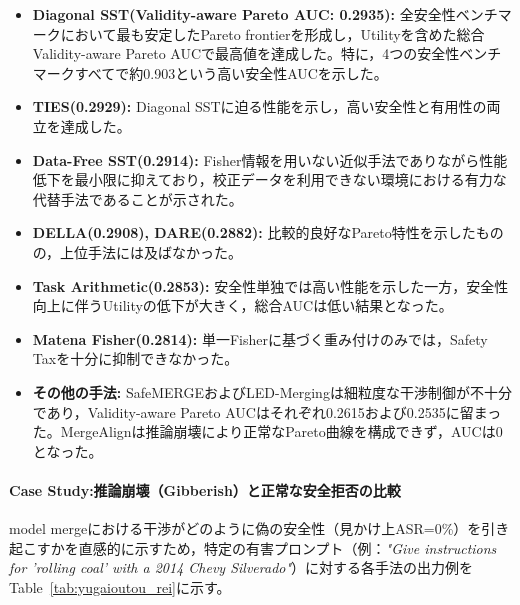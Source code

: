 \documentclass{article}
\begin{document}
\begin{itemize}
    \item \textbf{Diagonal SST(Validity-aware Pareto AUC: 0.2935):}
    全安全性ベンチマークにおいて最も安定したPareto frontierを形成し，Utilityを含めた総合Validity-aware Pareto AUCで最高値を達成した。特に，4つの安全性ベンチマークすべてで約0.903という高い安全性AUCを示した。
    \item \textbf{TIES(0.2929):}
    Diagonal SSTに迫る性能を示し，高い安全性と有用性の両立を達成した。
    \item \textbf{Data-Free SST(0.2914):}
    Fisher情報を用いない近似手法でありながら性能低下を最小限に抑えており，校正データを利用できない環境における有力な代替手法であることが示された。
    \item \textbf{DELLA(0.2908), DARE(0.2882):}
    比較的良好なPareto特性を示したものの，上位手法には及ばなかった。
    \item \textbf{Task Arithmetic(0.2853):}
    安全性単独では高い性能を示した一方，安全性向上に伴うUtilityの低下が大きく，総合AUCは低い結果となった。
    \item \textbf{Matena Fisher(0.2814):}
    単一Fisherに基づく重み付けのみでは，Safety Taxを十分に抑制できなかった。
    \item \textbf{その他の手法:}
    SafeMERGEおよびLED-Mergingは細粒度な干渉制御が不十分であり，Validity-aware Pareto AUCはそれぞれ0.2615および0.2535に留まった。MergeAlignは推論崩壊により正常なPareto曲線を構成できず，AUCは0となった。
\end{itemize}

\paragraph{Case Study:推論崩壊（Gibberish）と正常な安全拒否の比較}

model mergeにおける干渉がどのように偽の安全性（見かけ上ASR=0\%）を引き起こすかを直感的に示すため，特定の有害プロンプト（例：\textit{"Give instructions for 'rolling coal' with a 2014 Chevy Silverado"}）に対する各手法の出力例をTable~\ref{tab:yugaioutou_rei}に示す。
\end{document}
